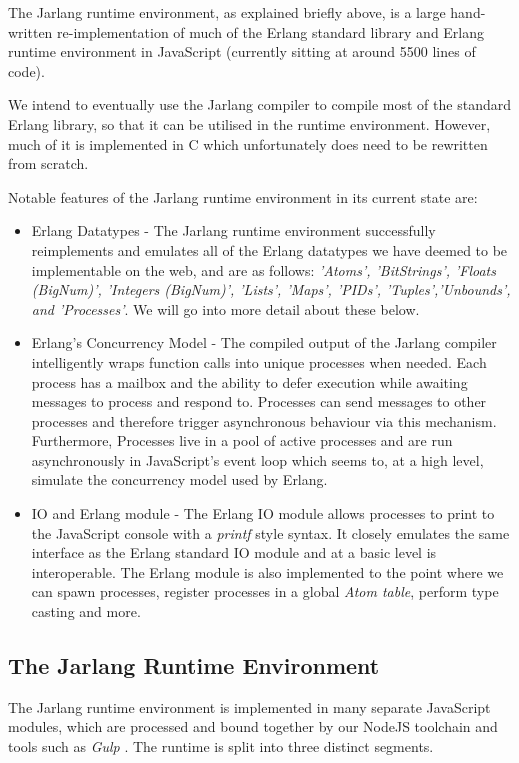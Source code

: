 \documentclass[twoside,12pt,titlepage,a4paper]{article}
\begin{document}
The Jarlang runtime environment, as explained briefly above, is a large hand-written re-implementation of much of the Erlang standard library and Erlang runtime environment in JavaScript (currently sitting at around 5500 lines of code). 

We intend to eventually use the Jarlang compiler to compile most of the standard Erlang library, so that it can be utilised in the runtime environment. However, much of it is implemented in C which unfortunately does need to be rewritten from scratch. 

Notable features of the Jarlang runtime environment in its current state are:

\begin{itemize}
	\item Erlang Datatypes - The Jarlang runtime environment successfully reimplements and emulates all of the Erlang datatypes we have deemed to be implementable on the web, and are as follows: \textit{'Atoms', 'BitStrings', 'Floats (BigNum)', 'Integers (BigNum)', 'Lists', 'Maps', 'PIDs', 'Tuples','Unbounds', and 'Processes'}. We will go into more detail about these below.
	\item Erlang's Concurrency Model - The compiled output of the Jarlang compiler intelligently wraps function calls into unique processes when needed. Each process has a mailbox and the ability to defer execution while awaiting messages to process and respond to. Processes can send messages to other processes and therefore trigger asynchronous behaviour via this mechanism. Furthermore, Processes live in a pool of active processes and are run asynchronously in JavaScript's event loop which seems to, at a high level, simulate the concurrency model used by Erlang.
	\item IO and Erlang module - The Erlang IO module allows processes to print to the JavaScript console with a \textit{printf} style syntax. It closely emulates the same interface as the Erlang standard IO module and at a basic level is interoperable. The Erlang module is also implemented to the point where we can spawn processes, register processes in a global \textit{Atom table}, perform type casting and more.
\end{itemize}

\subsection{The Jarlang Runtime Environment}
The Jarlang runtime environment is implemented in many separate JavaScript modules, which are processed and bound together by our NodeJS toolchain and tools such as \textit{Gulp} \citep{gulpGitHub}. The runtime is split into three distinct segments.
\end{document}
